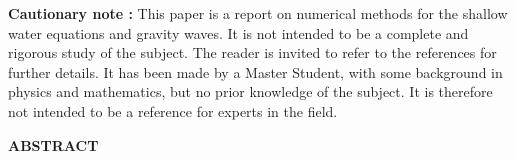 \documentclass[11pt,a4paper]{report}
\begin{document}
\begin{titlepage}
\begin{center}
        \begin{minipage}{14cm}
            \small{
                \textbf{Cautionary note : } This paper is a report on numerical methods for the shallow water equations and gravity waves. It is not intended to be a complete and rigorous study of the subject. The reader is invited to refer to the references for further details.
                It has been made by a Master Student, with some background in physics and mathematics, but no prior knowledge of the subject. It is therefore not intended to be a reference for experts in the field.}
        \end{minipage}

    \end{center}

\end{titlepage}

\newpage
\begin{multicols*}{2}
    \tableofcontents

\end{multicols*}
\newpage


\begin{center}
    \textbf{ABSTRACT}
\end{center}
\fontsize{9}{10}\selectfont
\end{document}
